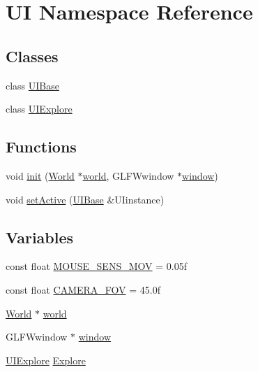 \hypertarget{namespace_u_i}{}\section{UI Namespace Reference}
\label{namespace_u_i}
\subsection*{Classes}
\begin{DoxyCompactItemize}
\item 
class \hyperlink{class_u_i_1_1_u_i_base}{U\+I\+Base}
\item 
class \hyperlink{class_u_i_1_1_u_i_explore}{U\+I\+Explore}
\end{DoxyCompactItemize}
\subsection*{Functions}
\begin{DoxyCompactItemize}
\item 
void \hyperlink{namespace_u_i_a16e5aee40bc2d40e67afdfe6749ecc12}{init} (\hyperlink{class_world}{World} $\ast$\hyperlink{namespace_u_i_a84dc8a978d6b785608801d14bac894b7}{world}, G\+L\+F\+Wwindow $\ast$\hyperlink{namespace_u_i_ac05ba8c1833c723ee85c762399654d3e}{window})
\item 
void \hyperlink{namespace_u_i_af31deeef2d9fe94fa317bdf1adc6e942}{set\+Active} (\hyperlink{class_u_i_1_1_u_i_base}{U\+I\+Base} \&U\+Iinstance)
\end{DoxyCompactItemize}
\subsection*{Variables}
\begin{DoxyCompactItemize}
\item 
const float \hyperlink{namespace_u_i_a3acb427a17b83fb6a34d117989a7c435}{M\+O\+U\+S\+E\+\_\+\+S\+E\+N\+S\+\_\+\+M\+OV} = 0.\+05f
\item 
const float \hyperlink{namespace_u_i_a807544150b32fe6af7851672f882500b}{C\+A\+M\+E\+R\+A\+\_\+\+F\+OV} = 45.\+0f
\item 
\hyperlink{class_world}{World} $\ast$ \hyperlink{namespace_u_i_a84dc8a978d6b785608801d14bac894b7}{world}
\item 
G\+L\+F\+Wwindow $\ast$ \hyperlink{namespace_u_i_ac05ba8c1833c723ee85c762399654d3e}{window}
\item 
\hyperlink{class_u_i_1_1_u_i_explore}{U\+I\+Explore} \hyperlink{namespace_u_i_a5724793eec5b84e087210957c562dad6}{Explore}
\end{DoxyCompactItemize}


